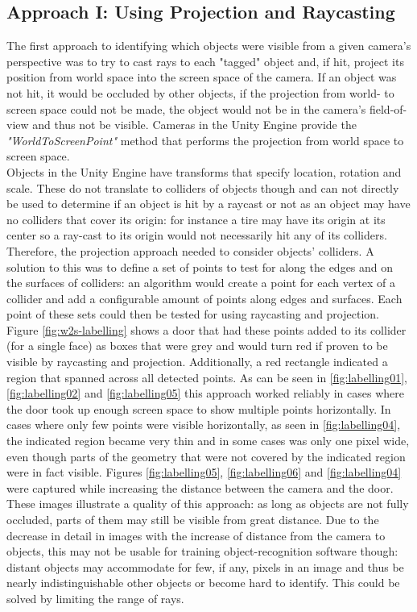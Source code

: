 \subsection{Approach I: Using Projection and Raycasting}
The first approach to identifying which objects were visible from a given camera's perspective was to try to cast rays to each "tagged" object and, if hit, project its position from world space into the screen space of the camera. If an object was not hit, it would be occluded by other objects, if the projection from world- to screen space could not be made, the object would not be in the camera's field-of-view and thus not be visible. Cameras in the Unity Engine provide the \emph{"WorldToScreenPoint"} \cite{UnityDocsCamera} method that performs the projection from world space to screen space.\\
Objects in the Unity Engine have transforms that specify location, rotation and scale. These do not translate to colliders of objects though and can not directly be used to determine if an object is hit by a raycast or not as an object may have no colliders that cover its origin: for instance a tire may have its origin at its center so a ray-cast to its origin would not necessarily hit any of its colliders. Therefore, the projection approach needed to consider objects' colliders. A solution to this was to define a set of points to test for along the edges and on the surfaces of colliders: an algorithm would create a point for each vertex of a collider and add a configurable amount of points along edges and surfaces. Each point of these sets could then be tested for using raycasting and projection.\\
Figure \ref{fig:w2s-labelling} shows a door that had these points added to its collider (for a single face) as boxes that were grey and would turn red if proven to be visible by raycasting and projection. Additionally, a red rectangle indicated a region that spanned across all detected points. As can be seen in \ref{fig:labelling01}, \ref{fig:labelling02} and \ref{fig:labelling05} this approach worked reliably in cases where the door took up enough screen space to show multiple points horizontally. In cases where only few points were visible horizontally, as seen in \ref{fig:labelling04}, the indicated region became very thin and in some cases was only one pixel wide, even though parts of the geometry that were not covered by the indicated region were in fact visible. Figures \ref{fig:labelling05}, \ref{fig:labelling06} and \ref{fig:labelling04} were captured while increasing the distance between the camera and the door. These images illustrate a quality of this approach: as long as objects are not fully occluded, parts of them may still be visible from great distance. Due to the decrease in detail in images with the increase of distance from the camera to objects, this may not be usable for training object-recognition software though: distant objects may accommodate for few, if any, pixels in an image and thus be nearly indistinguishable other objects or become hard to identify. This could be solved by limiting the range of rays.\\
